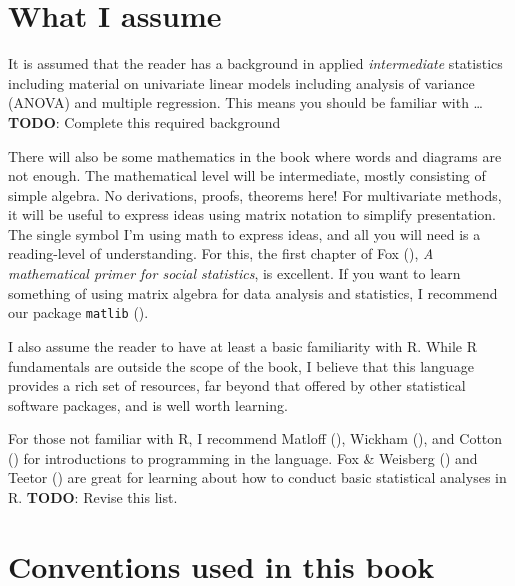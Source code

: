 \documentclass[
  letterpaper,
  10pt,
  krantz2]{krantz}
\begin{document}
\section*{What I assume}\label{what-i-assume}


It is assumed that the reader has a background in applied
\emph{intermediate} statistics including material on univariate linear
models including analysis of variance (ANOVA) and multiple regression.
This means you should be familiar with \ldots{} \textbf{TODO}: Complete
this required background

There will also be some mathematics in the book where words and diagrams
are not enough. The mathematical level will be intermediate, mostly
consisting of simple algebra. No derivations, proofs, theorems here! For
multivariate methods, it will be useful to express ideas using matrix
notation to simplify presentation. The single symbol I'm using math to
express ideas, and all you will need is a reading-level of
understanding. For this, the first chapter of Fox
(), \emph{A mathematical primer for social
statistics}, is excellent. If you want to learn something of using
matrix algebra for data analysis and statistics, I recommend our package
\texttt{matlib} ().

I also assume the reader to have at least a basic familiarity with R.
While R fundamentals are outside the scope of the book, I believe that
this language provides a rich set of resources, far beyond that offered
by other statistical software packages, and is well worth learning.

For those not familiar with R, I recommend Matloff
(), Wickham
(), and Cotton
() for introductions to programming in
the language. Fox \& Weisberg ()
and Teetor () are great for learning
about how to conduct basic statistical analyses in R. \textbf{TODO}:
Revise this list.

\section*{Conventions used in this
book}\label{conventions-used-in-this-book}
\end{document}
